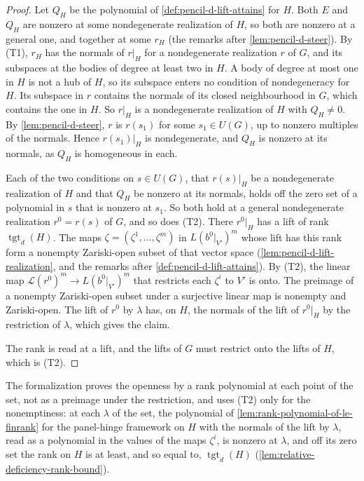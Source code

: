 \begin{proof}
  \leanok
  Let $Q_H$ be the polynomial of \cref{def:pencil-d-lift-attains} for $H$.
  Both $E$ and $Q_H$ are nonzero at some nondegenerate realization of $H$,
  so both are nonzero at a general one, and together at some $r_H$
  (the remarks after \cref{lem:pencil-d-steer}). By (T1), $r_H$ has the
  normals of $r|_H$ for a nondegenerate realization $r$ of $G$, and its
  subspaces at the bodies of degree at least two in $H$. A body of degree
  at most one in $H$ is not a hub of $H$, so its subspace enters no
  condition of nondegeneracy for $H$. Its subspace in $r$ contains the
  normals of its closed neighbourhood in $G$, which contains the one in
  $H$. So $r|_H$ is a nondegenerate realization of $H$ with
  $Q_H \ne 0$. By \cref{lem:pencil-d-steer}, $r$ is $r(s_1)$ for some
  $s_1 \in U(G)$, up to nonzero multiples of the normals. Hence
  $r(s_1)|_H$ is nondegenerate, and $Q_H$ is nonzero at its normals, as
  $Q_H$ is homogeneous in each.

  Each of the two conditions on $s \in U(G)$, that $r(s)|_H$ be a
  nondegenerate realization of $H$ and that $Q_H$ be nonzero at its
  normals, holds off the zero set of a polynomial in $s$ that is nonzero
  at $s_1$. So both hold at a general nondegenerate realization $r^0 =
  r(s)$ of $G$, and so does (T2). There $r^0|_H$ has a lift of rank
  $\operatorname{tgt}_d(H)$. The maps $\zeta = (\zeta^1, \dots, \zeta^m)$
  in $L(b^0|_{V'})^m$ whose lift has this rank form a nonempty
  Zariski-open subset of that vector space
  (\cref{lem:pencil-d-lift-realization}, and the remarks after
  \cref{def:pencil-d-lift-attains}). By (T2), the linear map
  $\mathcal{L}(r^0)^m \to L(b^0|_{V'})^m$ that restricts each $\zeta^i$ to
  $V'$ is onto. The preimage of a nonempty Zariski-open subset under a
  surjective linear map is nonempty and Zariski-open. The lift of $r^0$ by
  $\lambda$ has, on $H$, the normals of the lift of $r^0|_H$ by the
  restriction of $\lambda$, which gives the claim.

  The rank is read at a lift, and the lifts of $G$ must restrict onto the
  lifts of $H$, which is (T2).
\end{proof}

\begin{fmlnote}
  The formalization proves the openness by a rank polynomial at each
  point of the set, not as a preimage under the restriction, and uses
  (T2) only for the nonemptiness: at each $\lambda$ of the set, the
  polynomial of \cref{lem:rank-polynomial-of-le-finrank} for the
  panel-hinge framework on $H$ with the normals of the lift by
  $\lambda$, read as a polynomial in the values of the maps $\zeta^i$,
  is nonzero at $\lambda$, and off its zero set the rank on $H$ is at
  least, and so equal to, $\operatorname{tgt}_d(H)$
  (\cref{lem:relative-deficiency-rank-bound}).
\end{fmlnote}

